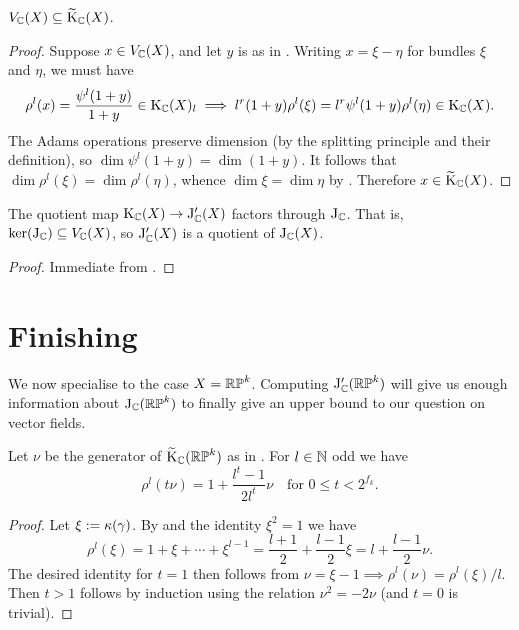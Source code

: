 \begin{lemma}
  \label{jprime-dim}
  $V_{\mathbb{C}}(X) \subseteq \widetilde{\mathrm{K}}_{\mathbb{C}}(X)$.
\end{lemma}

\begin{proof}
  Suppose $x \in V_{\mathbb{C}}(X)$, and let $y$ is as in . Writing
  $x = \xi - \eta$ for bundles $\xi$ and $\eta$, we must have
  \[
  \rho^l(x) = \frac{\psi^l(1+y)}{1+y} \in \mathrm{K}_{\mathbb{C}}(X)_l \implies
  l^r(1+y)\rho^l(\xi) = l^r\psi^l(1+y)\rho^l(\eta) \in \mathrm{K}_{\mathbb{C}}(X).
  \]
  The Adams operations preserve dimension (by the splitting principle
  and their definition), so $\dim \psi^l(1+y) = \dim {(1+y)}$. It
  follows that $\dim \rho^l(\xi) = \dim \rho^l(\eta)$, whence $\dim
  \xi = \dim \eta$ by . Therefore $x \in
  \widetilde{\mathrm{K}}_{\mathbb{C}}(X)$.
\end{proof}

\begin{proposition}
  \label{jprime-bound}
  The quotient map $\mathrm{K}_{\mathbb{C}}(X) \to \mathrm{J}_{\mathbb{C}}'(X)$ factors through
  $\mathrm{J}_{\mathbb{C}}$. That is, $\ker(\mathrm{J}_{\mathbb{C}}) \subseteq V_{\mathbb{C}}(X)$, so $\mathrm{J}_{\mathbb{C}}'(X)$
  is a quotient of $\mathrm{J}_{\mathbb{C}}(X)$.
\end{proposition}

\begin{proof}
  Immediate from .
\end{proof}


\section{Finishing}

We now specialise to the case $X = \mathbb{RP}^k$. Computing $\mathrm{J}_{\mathbb{C}}'(\mathbb{RP}^k)$
will give us enough information about $\mathrm{J}_{\mathbb{C}}(\mathbb{RP}^k)$ to finally give
an upper bound to our question  on vector fields.

\begin{lemma}
  \label{RP-cannibal}
  Let $\nu$ be the generator of $\widetilde{\mathrm{K}}_{\mathbb{C}}(\mathbb{RP}^k)$ as in
  . For $l \in \mathbb{N}$ odd we have
  \[
  \rho^l(t\nu) = 1 + \frac{l^t-1}{2l^t}\nu \quad\text{for }0 \le t <
  2^{f_k}.
  \]
\end{lemma}

\begin{proof}
  Let $\xi \mathrel{:=} \kappa(\gamma)$. By  and the
  identity $\xi^2 = 1$ we have
  \[
  \rho^l(\xi) = 1 + \xi + \cdots + \xi^{l-1} = \frac{l+1}2 +
  \frac{l-1}2\xi = l + \frac{l-1}{2}\nu.
  \]
  The desired identity for $t=1$ then follows from $\nu = \xi - 1
  \implies \rho^l(\nu) = \rho^l(\xi)/l$. Then $t > 1$ follows by
  induction using the relation $\nu^2 = -2\nu$ (and $t=0$ is trivial).
\end{proof}

